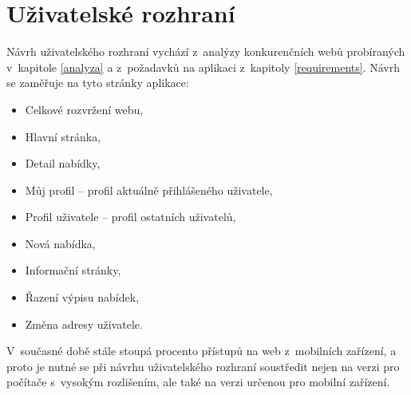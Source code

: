 \chapter{Uživatelské rozhraní}
\label{nur}

Návrh uživatelského rozhraní vychází z~analýzy konkurenčních webů probíraných v~kapitole \ref{analyza} a z~požadavků na aplikaci z~kapitoly \ref{requirements}. Návrh se zaměřuje na tyto stránky aplikace:
\begin{itemize}
    \item Celkové rozvržení webu,
	\item Hlavní stránka,
	\item Detail nabídky,
	\item Můj profil -- profil aktuálně přihlášeného uživatele,
	\item Profil uživatele -- profil ostatních uživatelů,
	\item Nová nabídka,
	\item Informační stránky,
	\item Řazení výpisu nabídek,
	\item Změna adresy uživatele.
\end{itemize}
V~současné době stále stoupá procento přístupů na web z~mobilních zařízení, a proto je nutné se při návrhu uživatelského rozhraní soustředit nejen na verzi pro počítače s~vysokým rozlišením, ale také na verzi určenou pro mobilní zařízení.








%





